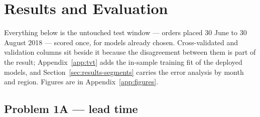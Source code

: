 \section{Results and Evaluation}
\label{sec:results}

Everything below is the untouched test window --- orders placed 30 June to 30
August 2018 --- scored once, for models already chosen. Cross-validated and validation columns sit beside
it because the disagreement between them is part of the result;
Appendix~\ref{app:tvt} adds the in-sample training fit of the deployed models,
and Section~\ref{sec:results-segments} carries the error analysis by month and
region. Figures are in Appendix~\ref{app:figures}.

\subsection{Problem 1A --- lead time}
\label{sec:results-reg}

\begin{table}[htbp]
\centering
\caption{Lead-time regression: two reference points that are not models, then
each family's complexity ladder. CV MAE is the mean over the five expanding
folds with its fold-to-fold standard deviation.  is the selected
and deployed model. Figure~\ref{fig:ladder}.}
\label{tab:reg}
\small
\setlength{\tabcolsep}{3.5pt}
\end{table}

